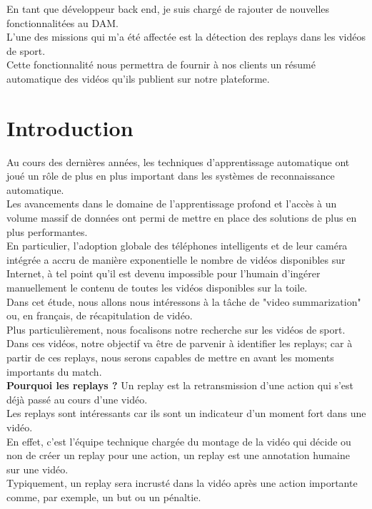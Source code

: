 \documentclass[11pt]{article}
\begin{document}
En tant que développeur back end, je suis chargé de rajouter de nouvelles fonctionnalitées au DAM.\\
L'une des missions qui m'a été affectée est la détection des replays dans les vidéos de sport.\\
Cette fonctionnalité nous permettra de fournir à nos clients un résumé automatique des vidéos qu'ils publient sur notre plateforme.\\

\newpage
\section{Introduction}
\label{sec:org6699185}
Au cours des dernières années, les techniques d'apprentissage automatique ont joué un rôle de plus en plus important dans les systèmes de reconnaissance automatique.\\
Les avancements dans le domaine de l'apprentissage profond et l'accès à un volume massif de données ont permi de mettre en place des solutions de plus en plus performantes.\\
En particulier, l'adoption globale des téléphones intelligents et de leur caméra intégrée a accru de manière exponentielle le nombre de vidéos disponibles sur Internet, à tel point qu'il est devenu impossible pour l'humain d'ingérer manuellement le contenu de toutes les vidéos disponibles sur la toile.\\
Dans cet étude, nous allons nous intéressons à la tâche de "video summarization" ou, en français, de récapitulation de vidéo.\\
Plus particulièrement, nous focalisons notre recherche sur les vidéos de sport.\\

Dans ces vidéos, notre objectif va être de parvenir à identifier les replays; car à partir de ces replays, nous serons capables de mettre en avant les moments importants du match.\\

\textbf{Pourquoi les replays ?} Un replay est la retransmission d'une action qui s'est déjà passé au cours d'une vidéo.\\
Les replays sont intéressants car ils sont un indicateur d'un moment fort dans une vidéo.\\
En effet, c'est l'équipe technique chargée du montage de la vidéo qui décide ou non de créer un replay pour une action, un replay est une annotation humaine sur une vidéo.\\
Typiquement, un replay sera incrusté dans la vidéo après une action importante comme, par exemple, un but ou un pénaltie.\\
\end{document}
